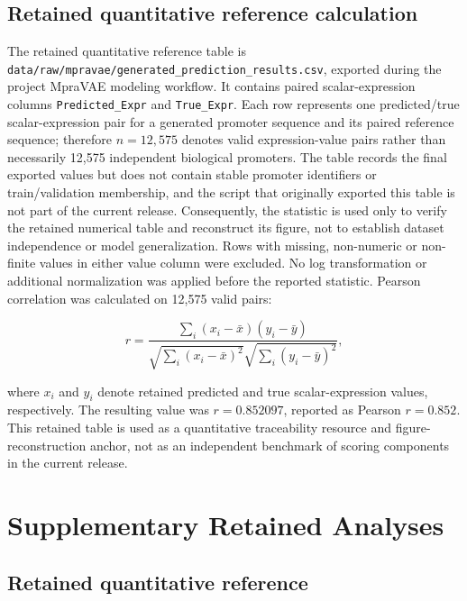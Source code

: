 \documentclass[10pt]{article}
\begin{document}
\subsection{Retained quantitative reference calculation}

The retained quantitative reference table is \texttt{data/raw/mpravae/generated\_prediction\_results.csv}, exported during the project MpraVAE modeling workflow. It contains paired scalar-expression columns \texttt{Predicted\_Expr} and \texttt{True\_Expr}. Each row represents one predicted/true scalar-expression pair for a generated promoter sequence and its paired reference sequence; therefore \(n=12{,}575\) denotes valid expression-value pairs rather than necessarily 12,575 independent biological promoters. The table records the final exported values but does not contain stable promoter identifiers or train/validation membership, and the script that originally exported this table is not part of the current release. Consequently, the statistic is used only to verify the retained numerical table and reconstruct its figure, not to establish dataset independence or model generalization. Rows with missing, non-numeric or non-finite values in either value column were excluded. No log transformation or additional normalization was applied before the reported statistic. Pearson correlation was calculated on 12,575 valid pairs:

\[
r =
\frac{\sum_i (x_i-\bar{x})(y_i-\bar{y})}
{\sqrt{\sum_i (x_i-\bar{x})^2}\sqrt{\sum_i (y_i-\bar{y})^2}},
\]

where \(x_i\) and \(y_i\) denote retained predicted and true scalar-expression values, respectively. The resulting value was \(r = 0.852097\), reported as Pearson \(r = 0.852\). This retained table is used as a quantitative traceability resource and figure-reconstruction anchor, not as an independent benchmark of scoring components in the current release.

\section{Supplementary Retained Analyses}

\subsection{Retained quantitative reference}
\end{document}
